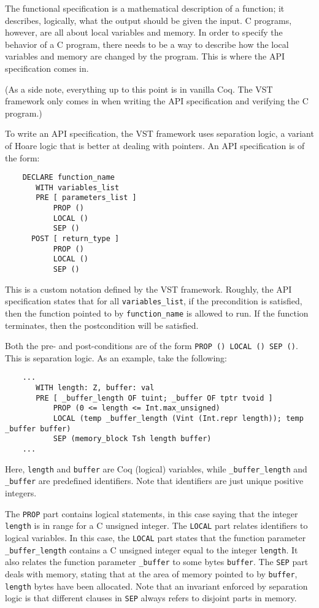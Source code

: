 \documentclass[pageno]{jpaper}
\begin{document}
The functional specification is a mathematical description of a function; it describes, logically, what the output should be given the input. C programs, however, are all about local variables and memory. In order to specify the behavior of a C program, there needs to be a way to describe how the local variables and memory are changed by the program. This is where the API specification comes in.

(As a side note, everything up to this point is in vanilla Coq. The VST framework only comes in when writing the API specification and verifying the C program.)

To write an API specification, the VST framework uses separation logic, a variant of Hoare logic that is better at dealing with pointers. An API specification is of the form:

\begin{lstlisting}
    DECLARE function_name
       WITH variables_list
       PRE [ parameters_list ]
           PROP ()
           LOCAL ()
           SEP ()
      POST [ return_type ]
           PROP ()
           LOCAL ()
           SEP ()
\end{lstlisting}

This is a custom notation defined by the VST framework. Roughly, the API specification states that for all \lstinline{variables_list}, if the precondition is satisfied, then the function pointed to by \lstinline{function_name} is allowed to run. If the function terminates, then the postcondition will be satisfied.

Both the pre- and post-conditions are of the form \lstinline{PROP () LOCAL () SEP ()}. This is separation logic. As an example, take the following:

\begin{lstlisting}
    ...
       WITH length: Z, buffer: val
       PRE [ _buffer_length OF tuint; _buffer OF tptr tvoid ]
           PROP (0 <= length <= Int.max_unsigned)
           LOCAL (temp _buffer_length (Vint (Int.repr length)); temp _buffer buffer)
           SEP (memory_block Tsh length buffer)
    ...
\end{lstlisting}


Here, \lstinline{length} and \lstinline{buffer} are Coq (logical) variables, while \lstinline{_buffer_length} and \lstinline{_buffer} are predefined identifiers. Note that identifiers are just unique positive integers.

The \lstinline{PROP} part contains logical statements, in this case saying that the integer \lstinline{length} is in range for a C unsigned integer. The \lstinline{LOCAL} part relates identifiers to logical variables. In this case, the \lstinline{LOCAL} part states that the function parameter \lstinline{_buffer_length} contains a C unsigned integer equal to the integer \lstinline{length}. It also relates the function parameter \lstinline{_buffer} to some bytes \lstinline{buffer}. The \lstinline{SEP} part deals with memory, stating that at the area of memory pointed to by \lstinline{buffer}, \lstinline{length} bytes have been allocated. Note that an invariant enforced by separation logic is that different clauses in \lstinline{SEP} always refers to disjoint parts in memory.
\end{document}
